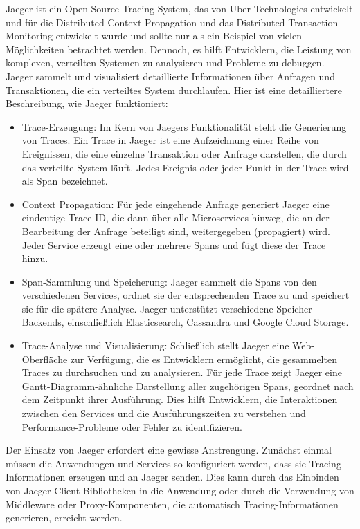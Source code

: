 Jaeger ist ein Open-Source-Tracing-System, das von Uber Technologies entwickelt und für die Distributed Context Propagation und das Distributed Transaction Monitoring entwickelt wurde und sollte nur als ein Beispiel von vielen Möglichkeiten betrachtet werden. Dennoch, es hilft Entwicklern, die Leistung von komplexen, verteilten Systemen zu analysieren und Probleme zu debuggen. Jaeger sammelt und visualisiert detaillierte Informationen über Anfragen und Transaktionen, die ein verteiltes System durchlaufen. Hier ist eine detailliertere Beschreibung, wie Jaeger funktioniert:
\begin{itemize}
\item Trace-Erzeugung: Im Kern von Jaegers Funktionalität steht die Generierung von Traces. Ein Trace in Jaeger ist eine Aufzeichnung einer Reihe von Ereignissen, die eine einzelne Transaktion oder Anfrage darstellen, die durch das verteilte System läuft. Jedes Ereignis oder jeder Punkt in der Trace wird als Span bezeichnet.

\item Context Propagation: Für jede eingehende Anfrage generiert Jaeger eine eindeutige Trace-ID, die dann über alle Microservices hinweg, die an der Bearbeitung der Anfrage beteiligt sind, weitergegeben (propagiert) wird. Jeder Service erzeugt eine oder mehrere Spans und fügt diese der Trace hinzu.

\item Span-Sammlung und Speicherung: Jaeger sammelt die Spans von den verschiedenen Services, ordnet sie der entsprechenden Trace zu und speichert sie für die spätere Analyse. Jaeger unterstützt verschiedene Speicher-Backends, einschließlich Elasticsearch, Cassandra und Google Cloud Storage.

\item Trace-Analyse und Visualisierung: Schließlich stellt Jaeger eine Web-Oberfläche zur Verfügung, die es Entwicklern ermöglicht, die gesammelten Traces zu durchsuchen und zu analysieren. Für jede Trace zeigt Jaeger eine Gantt-Diagramm-ähnliche Darstellung aller zugehörigen Spans, geordnet nach dem Zeitpunkt ihrer Ausführung. Dies hilft Entwicklern, die Interaktionen zwischen den Services und die Ausführungszeiten zu verstehen und Performance-Probleme oder Fehler zu identifizieren.
\end{itemize}

Der Einsatz von Jaeger erfordert eine gewisse Anstrengung. Zunächst einmal müssen die Anwendungen und Services so konfiguriert werden, dass sie Tracing-Informationen erzeugen und an Jaeger senden. Dies kann durch das Einbinden von Jaeger-Client-Bibliotheken in die Anwendung oder durch die Verwendung von Middleware oder Proxy-Komponenten, die automatisch Tracing-Informationen generieren, erreicht werden.

